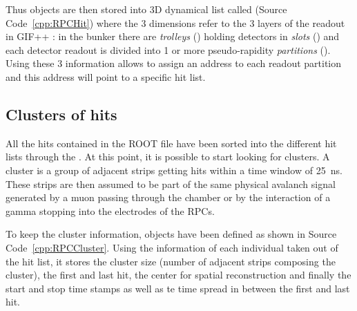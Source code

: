     Thus  objects are then stored into 3D dynamical list called  (Source Code~\ref{cpp:RPCHit}) where the 3 dimensions refer to the 3 layers of the readout in GIF++ : in the bunker there are \textit{trolleys} () holding detectors in \textit{slots} () and each detector readout is divided into 1 or more pseudo-rapidity \textit{partitions} (). Using these 3 information allows to assign an address to each readout partition and this address will point to a specific hit list.\\
	
	\subsection{Clusters of hits}
	\label{app2:ssec:RPCCluster}
	
	All the hits contained in the ROOT file have been sorted into the different hit lists through the . At this point, it is possible to start looking for clusters. A cluster is a group of adjacent strips getting hits within a time window of \SI{25}{ns}. These strips are then assumed to be part of the same physical avalanch signal generated by a muon passing through the chamber or by the interaction of a gamma stopping into the electrodes of the RPCs.
	
	To keep the cluster information,  objects have been defined as shown in Source Code~\ref{cpp:RPCCluster}. Using the information of each individual  taken out of the hit list, it stores the cluster size (number of adjacent strips composing the cluster), the first and last hit, the center for spatial reconstruction and finally the start and stop time stamps as well as te time spread in between the first and last hit.\\
	
